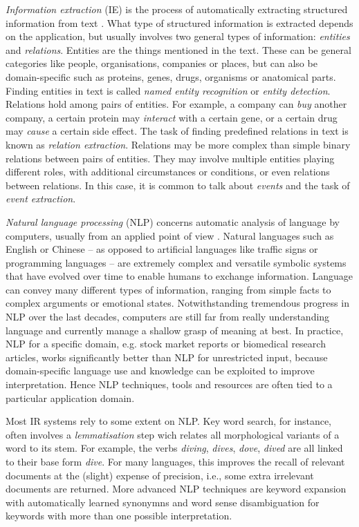 \emph{Information extraction} (IE) is the process of automatically extracting structured information from text \citep{Jiang2012Information}.
What type of structured information is extracted depends on the application, but usually involves two general types of information: \emph{entities} and \emph{relations}.
Entities are the things mentioned in the text.
These can be general categories like people, organisations, companies or places, but can also be domain-specific such as proteins, genes, drugs, organisms or anatomical parts.
Finding entities in text is called \emph{named entity recognition} or \emph{entity detection}.
Relations hold among pairs of entities.
For example, a company can \emph{buy} another company, a certain protein may \emph{interact} with a certain gene, or a certain drug may \emph{cause} a certain side effect.
The task of finding predefined relations in text is known as \emph{relation extraction}.  
Relations may be more complex than simple binary relations between pairs of entities.
They may involve multiple entities playing different roles, with additional circumstances or conditions, or even relations between relations.
In this case, it is common to talk about \emph{events} and the task of \emph{event extraction}.

\emph{Natural language processing} (NLP) concerns automatic analysis of language by computers, usually from an applied point of view  \citep{jurafsky2000speech,manning1999foundations}.
Natural languages such as English or Chinese -- as opposed to artificial languages like traffic signs or programming languages -- are extremely complex and versatile symbolic systems that have evolved over time to enable humans to exchange information.
Language can convey many different types of information, ranging from simple facts to complex arguments or emotional states.
Notwithstanding tremendous progress in NLP over the last decades, computers are still far from really understanding language and currently manage a shallow grasp of meaning at best.
In practice, NLP for a specific domain, e.g. stock market reports or biomedical research articles, works significantly better than NLP for unrestricted input, because domain-specific language use and knowledge can be exploited to improve interpretation. 
Hence NLP techniques, tools and resources are often tied to a particular application domain.

Most IR systems rely to some extent on NLP.
Key word search, for instance, often involves a \emph{lemmatisation} step wich relates all morphological variants of a word to its stem.
For example, the verbs \emph{diving}, \emph{dives}, \emph{dove}, \emph{dived} are all linked to their base form \emph{dive}.
For many languages, this improves the recall of relevant documents at the (slight) expense of precision, i.e., some extra irrelevant documents are returned.
More advanced NLP techniques are keyword expansion with automatically learned synonymns and word sense disambiguation for keywords with more than one possible interpretation.  

